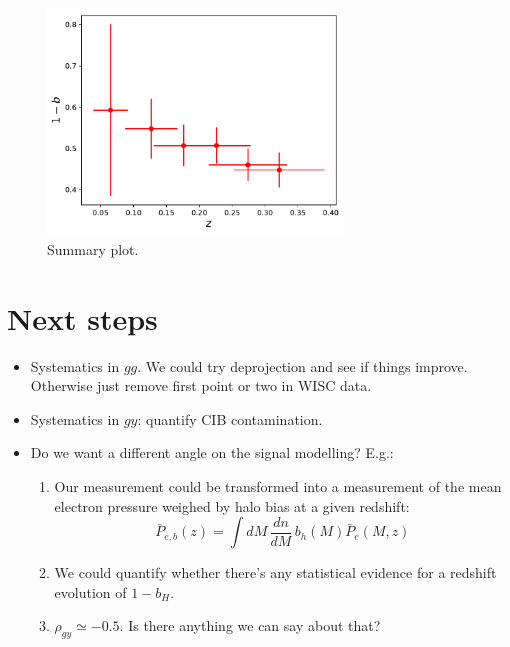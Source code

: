 \documentclass{article}
\begin{document}
  \begin{figure}
   \centering
   \includegraphics[width = 0.7\textwidth]{../output_test/sampler_minimal_hmc_b_hydro_all}
   \caption{Summary plot.}\label{fig:oneminusb}
  \end{figure}

\newpage
\section{Next steps}
\begin{itemize}
  \item Systematics in $gg$. We could try deprojection and see if things improve. Otherwise just remove first point or two in WISC data.
  \item Systematics in $gy$: quantify CIB contamination.
  \item Do we want a different angle on the signal modelling? E.g.:
        \begin{enumerate}
          \item Our measurement could be transformed into a measurement of the mean electron pressure weighed by halo bias at a given redshift:
                \begin{equation}
                  \bar{P}_{e,b}(z) = \int dM\,\frac{dn}{dM}\,b_h(M) \bar{P}_e(M,z)
                \end{equation}
          \item We could quantify whether there's any statistical evidence for a redshift evolution of $1-b_H$.
          \item $\rho_{gy}\simeq-0.5$. Is there anything we can say about that?
        \end{enumerate}
\end{itemize}

  


\end{document}
